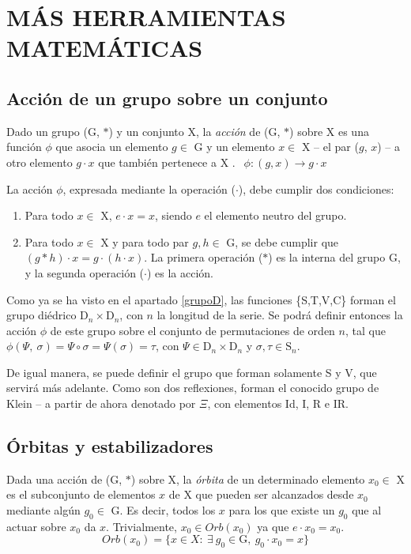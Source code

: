	\chapter{MÁS HERRAMIENTAS MATEMÁTICAS}	
	\section{Acción de un grupo sobre un conjunto}
		Dado un grupo (G, $*$) y un conjunto X, la \emph{acción} de (G, $*$) sobre X es una función $\phi$ que asocia un elemento $g \in$ G y un elemento $x \in$ X -- el par ($g$, $x$) -- a otro elemento $g\cdot x$ que también pertenece a X \cite{armstrong}. $\ \ \phi :(g,x) \to g\cdot x$
	
		La acción $\phi$, expresada mediante la operación ($\cdot$), debe cumplir dos condiciones:
		\begin{enumerate}
			\item{Para todo $x\in$ X, $e\cdot x=x$, siendo $e$ el elemento neutro del grupo.}
		
			\item{Para todo $x\in$ X y para todo par $g,h\in$ G, se debe cumplir que $(g*h)\cdot x=g\cdot (h\cdot x)$. La primera operación ($*$) es la interna del grupo G, y la segunda operación ($\cdot$) es la acción.}
		\end{enumerate}
		Como ya se ha visto en el apartado \ref{grupoD}, las funciones \{S,T,V,C\} forman el grupo diédrico $\text{D}_{n}\times\text{D}_{n}$, con $n$ la longitud de la serie. Se podrá definir entonces la acción $\phi$ de este grupo sobre el conjunto de permutaciones de orden $n$, tal que $\phi(\Psi,\ \sigma)=\Psi\circ\sigma=\Psi(\sigma)=\tau$, con $\Psi\in\text{D}_{n}\times\text{D}_{n}$ y $\sigma,\tau\in\text{S}_n$.
		
		De igual manera, se puede definir el grupo que forman solamente S y V, que servirá más adelante. Como son dos reflexiones, forman el conocido grupo de Klein -- a partir de ahora denotado por $\Xi$, con elementos Id, I, R e IR.

	\section{Órbitas y estabilizadores}	
		Dada una acción de (G, $*$) sobre X, la \emph{órbita} de un determinado elemento $x_0\in$ X es el subconjunto de elementos $x$ de X que pueden ser alcanzados desde $x_0$ mediante algún $g_0\in$ G. Es decir, todos los $x$ para los que existe un $g_0$ que al actuar sobre $x_0$ da $x$. Trivialmente, $x_0\in Orb(x_0)$ ya que $e\cdot x_0=x_0$.
		\[Orb(x_0)=\{x\in X :\ \exists \ g_0\in \text{G},\ g_0\cdot x_0 =x\}\]
	
